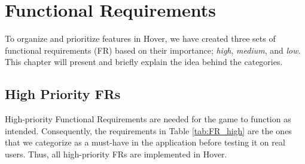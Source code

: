 \section{Functional Requirements}
\label{chap:requirements}
To organize and prioritize features in Hover, we have created three sets of functional requirements (FR) based on their importance; \textit{high}, \textit{medium}, and \textit{low}. This chapter will present and briefly explain the idea behind the categories.

\subsection{High Priority FRs}
High-priority Functional Requirements are needed for the game to function as intended. Consequently, the requirements in Table \ref{tab:FR_high} are the ones that we categorize as a must-have in the application before testing it on real users. Thus, all high-priority FRs are implemented in Hover.

